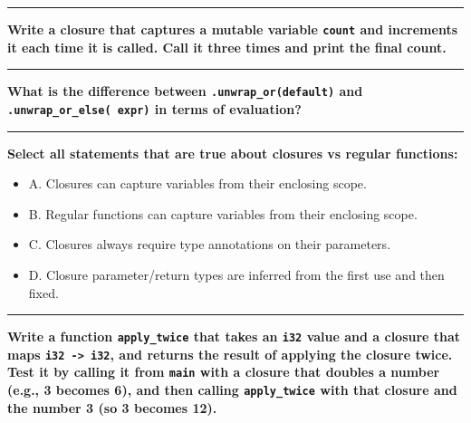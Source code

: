 \documentclass[
  11pt,
]{article}
\newenvironment{Shaded}{}{}
\providecommand{\tightlist}{%
  \setlength{\itemsep}{0pt}\setlength{\parskip}{0pt}}
\begin{document}
\begin{center}\rule{0.5\linewidth}{0.5pt}\end{center}

\textbf{Write a closure that captures a mutable variable \texttt{count}
and increments it each time it is called. Call it three times and print
the final count.}

\begin{Shaded}
\begin{Highlighting}[]

\end{Highlighting}
\end{Shaded}

\begin{center}\rule{0.5\linewidth}{0.5pt}\end{center}

\textbf{What is the difference between \texttt{.unwrap\_or(default)} and
\texttt{.unwrap\_or\_else(\textbar{}\textbar{}\ expr)} in terms of
evaluation?}

\begin{center}\rule{0.5\linewidth}{0.5pt}\end{center}

\textbf{Select all statements that are true about closures vs regular
functions:}

\begin{itemize}
\tightlist
\item[$\square$]
  A. Closures can capture variables from their enclosing scope.
\item[$\square$]
  B. Regular functions can capture variables from their enclosing scope.
\item[$\square$]
  C. Closures always require type annotations on their parameters.
\item[$\square$]
  D. Closure parameter/return types are inferred from the first use and
  then fixed.
\end{itemize}

\begin{center}\rule{0.5\linewidth}{0.5pt}\end{center}

\textbf{Write a function \texttt{apply\_twice} that takes an
\texttt{i32} value and a closure that maps
\texttt{i32\ -\textgreater{}\ i32}, and returns the result of applying
the closure twice. Test it by calling it from \texttt{main} with a
closure that doubles a number (e.g., 3 becomes 6), and then calling
\texttt{apply\_twice} with that closure and the number 3 (so 3 becomes
12).}
\end{document}
